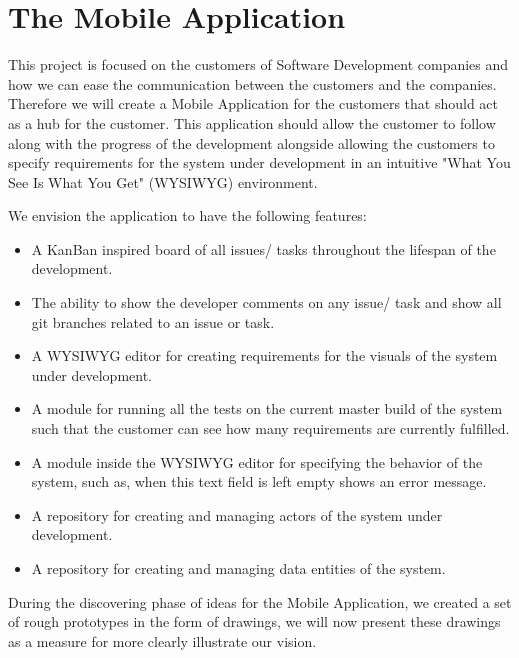 \section{The Mobile Application}
This project is focused on the customers of Software Development companies and how we can ease the communication between the customers and the companies.
Therefore we will create a Mobile Application for the customers that should act as a hub for the customer. 
This application should allow the customer to follow along with the progress of the development alongside allowing the customers to specify requirements for the system under development in an intuitive "What You See Is What You Get" (WYSIWYG) environment.

We envision the application to have the following features:

\begin{itemize}
    \item A KanBan inspired board of all issues/ tasks throughout the lifespan of the development.
    \item The ability to show the developer comments on any issue/ task and show all git branches related to an issue or task.
    \item A WYSIWYG editor for creating requirements for the visuals of the system under development.
    \item A module for running all the tests on the current master build of the system such that the customer can see how many requirements are currently fulfilled.
    \item A module inside the WYSIWYG editor for specifying the behavior of the system, such as, when this text field is left empty shows an error message.
    \item A repository for creating and managing actors of the system under development.
    \item A repository for creating and managing data entities of the system.
\end{itemize}

During the discovering phase of ideas for the Mobile Application, we created a set of rough prototypes in the form of drawings, we will now present these drawings as a measure for more clearly illustrate our vision.

